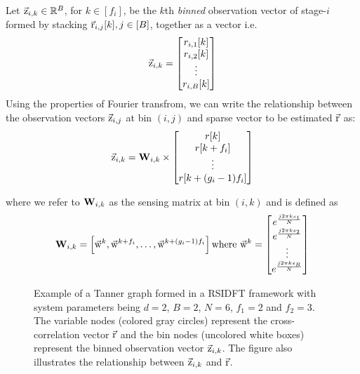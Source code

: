 	 Let $\vec{\mathrm{z}}_{i,k}\in\mathbb{R}^{B}$, for $k\in [f_i]$, be the $k$th \textit{binned} observation vector of stage-$i$ formed by stacking $\vec{\mathrm{r}}_{i,j}[k], j\in[B]$, together as a vector i.e.
\[
	  \vec{\mathrm{z}}_{i,k} = \begin{bmatrix}
	 r_{i,1}[k] \\
	 r_{i,2}[k] \\
	 \vdots\\
	 r_{i,B}[k]
	 \end{bmatrix}
\]
Using the properties of Fourier transfrom, we can write the relationship between the observation vectors $\vec{\mathrm{z}}_{i,j}$ at bin $(i,j)$ and sparse vector to be estimated $\vec{\mathrm{r}}$ as:
\begin{align}
	\label{Eqn:Generator Equation}
	\vec{\mathrm{z}}_{i,k}= \mathbf{W}_{i,k} \times
	\begin{bmatrix}
		r[k] \\
		r[k+f_i] \\
		\vdots\\
		r[k+(g_i-1)f_i]
	\end{bmatrix}
\end{align}

where we refer to $\mathbf{W}_{i,k}$ as the sensing matrix at bin $(i,k)$ and is defined as
\begin{align}\label{Eqn:Sensing Matrix}
	\mathbf{W}_{i,k} = \left[\vec{\mathrm{w}}^{k},\vec{\mathrm{w}}^{k+f_i},\ldots, \vec{\mathrm{w}}^{k+(g_i-1)f_i}\right] \text{where} ~\vec{\mathrm{w}}^{k}=
	\begin{bmatrix}
		e^{\frac{j2\pi ks_1}{N}}\\
		e^{\frac{j2\pi ks_2}{N}}\\
		\vdots\\
		e^{\frac{j2\pi ks_B}{N}}
	\end{bmatrix}
\end{align}

\begin{figure}[h!]
	\begin{center}
	 	\resizebox{0.45\textwidth}{!}{}	
	\end{center}	
	\caption{Example of a Tanner graph formed in a RSIDFT framework with system parameters being $d=2$, $B=2$, $N=6$, $f_1 = 2$ and $f_2=3$. The variable nodes (colored gray circles) represent the cross-correlation vector $\vec{\mathrm{r}}$ and the bin nodes (uncolored white boxes) represent the binned observation vector $\vec{\mathrm{z}}_{i,k}$. The figure also illustrates the relationship between $\vec{\mathrm{z}}_{i,k}$ and $\vec{\mathrm{r}}$.}\label{fig:factorgraph}
	\vspace{5 pt}
\end{figure}
 
